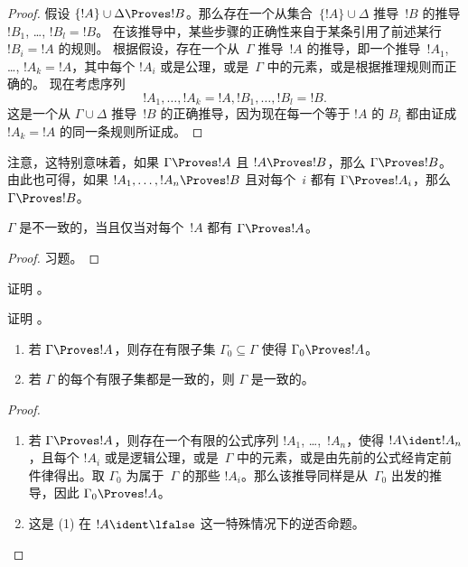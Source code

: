 \documentclass[../../../include/open-logic-section]{subfiles}
\begin{document}
\begin{proof}
  假设 $\{!A\} \cup \Delta \Proves !B$。那么存在一个从集合~$\{!A\} \cup \Delta$ 推导~$!B$ 的推导 $!B_1$, \dots, $!B_l = !B$。
  在该推导中，某些步骤的正确性来自于某条引用了前述某行~$!B_i = !A$ 的规则。
  根据假设，存在一个从~$\Gamma$ 推导~$!A$ 的推导，即一个推导~$!A_1$, \dots, $!A_k = !A$，其中每个 $!A_i$ 或是公理，或是~$\Gamma$ 中的元素，或是根据推理规则而正确的。
  现在考虑序列
  \[
  !A_1, \dots, !A_k = !A, !B_1, \dots, !B_l = !B.
  \]
  这是一个从 $\Gamma \cup \Delta$ 推导~$!B$ 的正确推导，因为现在每一个等于 $!A$ 的 $B_i$ 都由证成 $!A_k = !A$ 的同一条规则所证成。
\end{proof}

注意，这特别意味着，如果 $\Gamma \Proves !A$ 且 $!A
\Proves !B$，那么 $\Gamma \Proves !B$。由此也可得，如果 $!A_1,
\dots, !A_n \Proves !B$ 且对每个~$i$ 都有 $\Gamma \Proves !A_i$，那么
$\Gamma \Proves !B$。

\begin{prop}
$\Gamma$ 是不一致的，当且仅当对每个~$!A$ 都有 $\Gamma \Proves !A$。
\end{prop}

\begin{proof}
习题。
\end{proof}



\begin{prob}
证明 。
\end{prob}


\tagendprob



\begin{prob}
证明 。
\end{prob}


\tagendprob

\begin{prop}[紧致性]
  \begin{enumerate}
  \item 若 $\Gamma \Proves !A$，则存在有限子集 $\Gamma_0
    \subseteq \Gamma$ 使得 $\Gamma_0 \Proves !A$。
  \item 若 $\Gamma$ 的每个有限子集都是一致的，则 $\Gamma$ 是一致的。
  \end{enumerate}
\end{prop}

\begin{proof}
  \begin{enumerate}
    \item 若 $\Gamma \Proves !A$，则存在一个有限的公式序列 $!A_1$, \dots,~$!A_n$，使得 $!A \ident !A_n$，且每个 $!A_i$ 或是逻辑公理，或是~$\Gamma$ 中的元素，或是由先前的公式经肯定前件律得出。取 $\Gamma_0$ 为属于~$\Gamma$ 的那些 $!A_i$。那么该推导同样是从~$\Gamma_0$ 出发的推导，因此 $\Gamma_0 \Proves !A$。
    \item 这是 (1) 在 $!A \ident \lfalse$ 这一特殊情况下的逆否命题。
\end{enumerate}
\end{proof}
\end{document}
